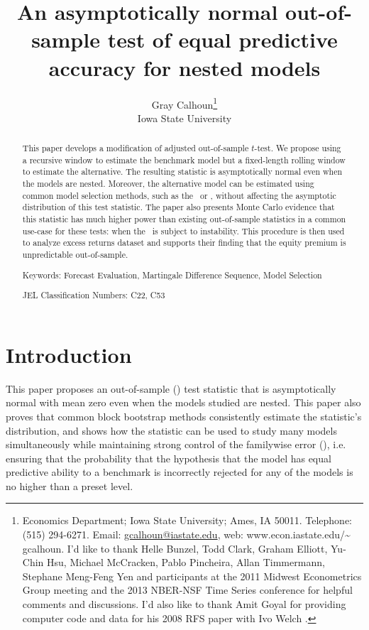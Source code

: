 \documentclass[12pt,fleqn]{article}
\author{Gray Calhoun\thanks{ Economics Department; Iowa State
    University; Ames, IA 50011.  Telephone: (515) 294-6271.  Email:
    \guillemotleft \protect\url{gcalhoun@iastate.edu}\guillemotright,
    web: \guillemotleft www.econ.iastate.edu/\textasciitilde
    gcalhoun\guillemotright.
    I'd like to
    thank Helle Bunzel, Todd Clark, Graham Elliott, Yu-Chin Hsu,
    Michael McCracken, Pablo Pincheira, Allan Timmermann, Stephane
    Meng-Feng Yen and participants at the 2011 Midwest Econometrics
    Group meeting and the 2013 NBER-NSF Time Series conference
    for helpful comments and discussions.  I'd also like to thank Amit
    Goyal for providing computer code and data for his 2008
    RFS paper with Ivo Welch \citep{GoW:08}.}\\%
  Iowa State University}
\title{An asymptotically normal out-of-sample
  test of equal predictive accuracy for nested models}
\begin{document}
\maketitle

\begin{abstract}
  \noindent This paper develops a modification of  adjusted out-of-sample $t$-test. We propose
  using a recursive window to estimate the benchmark model but a
  fixed-length rolling window to estimate the alternative. The
  resulting statistic is asymptotically normal even when the models
  are nested.  Moreover, the alternative model can be estimated using
  common model selection methods, such as the \aic\ or \bic, without
  affecting the asymptotic distribution of this test statistic.  The
  paper also presents Monte Carlo evidence that this statistic has
  much higher power than existing out-of-sample statistics in a common
  use-case for these tests: when the \dgp\ is subject to instability.
  This procedure is then used to analyze
   excess returns dataset
  and supports their finding that the equity premium is unpredictable
  out-of-sample.

\strut

\noindent Keywords: Forecast Evaluation, Martingale Difference
Sequence, Model Selection

\strut

\noindent JEL Classification Numbers: C22, C53

\end{abstract}

\newpage

\section{Introduction} This paper proposes an out-of-sample (\oos)
test statistic that is asymptotically normal with mean zero even when
the models studied are nested.  This paper also proves that common
block bootstrap methods consistently estimate the statistic's
distribution, and shows how the statistic can be used to study many
models simultaneously while maintaining strong control of the
familywise error (\fwe), i.e. ensuring that the probability that the
hypothesis that the model has equal predictive ability to a benchmark
is incorrectly rejected for any of the models is no higher than a
preset level.
\end{document}
